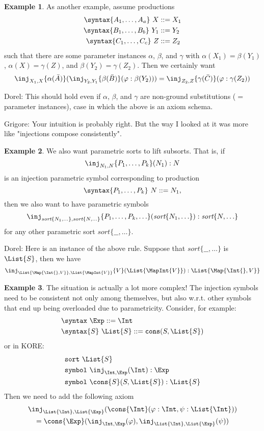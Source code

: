 \documentclass{article}
\newcommand\comment[2]{\par\noindent\color{red}#1: #2\color{black}\par\noindent}
\newcommand\dl{\comment{Dorel}}
\newcommand\gr{\comment{Grigore}}
\theoremstyle{definition}
\newtheorem{example}{Example}[section]
\theoremstyle{definition}
\theoremstyle{definition}
\theoremstyle{definition}
\theoremstyle{theorem}
\theoremstyle{theorem}
\theoremstyle{theorem}
\theoremstyle{theorem}
\theoremstyle{theorem}
\newcommand{\Sort}[1]{\textit{sort}\{#1\}}
\newcommand{\KWsymbol}{\texttt{symbol}}
\newcommand{\sort}{\texttt{sort}}
\begin{document}
\begin{example}\label{consistency-compose}
As another example, assume productions
\begin{align*}
\syntax\{A_1,\ldots,A_a\}\ X & ::=X_1\\
\syntax\{B_1,\ldots,B_b\}\ Y_1 & ::=Y_2\\
\syntax\{C_1,\ldots,C_c\}\ Z & ::=Z_2\\
\end{align*}
such that there are some parameter instances
\(\alpha\), \(\beta\), and \(\gamma\) with
\(\alpha(X_1) = \beta(Y_1)\), \(\alpha(X) = \gamma(Z)\),
and \(\beta(Y_2) = \gamma(Z_2)\).
Then we certainly want
\[\inj_{X_1,X}\{\alpha(\bar{A})\}(
  \inj_{Y_2,Y_1}\{\beta(\bar{B})\}(\varphi:\beta(Y_2)))
 = \inj_{Z_2,Z}\{\gamma(\bar{C})\}(\varphi:\gamma(Z_2))\]
\dl{This should hold even if $\alpha$, $\beta$, and $\gamma$ are non-ground substitutions ($=$ parameter instances), case in which the above is an axiom schema.}
\gr{Your intuition is probably right.  But the way I looked at it was more like "injections compose consistently".}
\end{example}

\begin{example}\label{consistency-lifting}
We also want parametric sorts to lift subsorts.
That is, if
\[\inj_{N_1,N}\{P_1,\ldots,P_k\}(N_1):N\]
is an injection parametric symbol corresponding to production
\[\syntax\{P_1,\ldots,P_k\}\ N::=N_1,\]
then we also want to have parametric symbols
\[\inj_{\Sort{N_1,\ldots},\Sort{N,\ldots}}
   \{P_1,\ldots,P_k,\ldots\}
    (\Sort{N_1,\ldots}) : \Sort{N,\ldots}\]
for any other parametric sort \(\Sort{\_\!\_,\ldots}\).
\dl{Here is an instance of the above rule. Suppose that \(\Sort{\_\!\_,\ldots}\) is
$\List{S}$, then we have
\[\inj_{\List{\Map{\Int\{\},V}},\List{\MapInt{V}}}\{V\}(\List{\MapInt{V}}):\List{\Map{\Int\{\},V}}\] 
}
\end{example}

\begin{example}\label{consistency-parametric}
The situation is actually a lot more complex!
The injection symbols need to be consistent not only among
themselves, but also w.r.t. other symbols that end up
being overloaded due to parametricity.
Consider, for example:
\begin{align*}
&\syntax\ \Exp::=\Int\\
&\syntax\{S\}\ \List{S}::=\texttt{cons}(S,\List{S})
\end{align*}
or in KORE:
\begin{align*}
&\sort\ \List{S}\\
&\KWsymbol\ \inj_{\Int,\Exp}(\Int):\Exp\\
&\KWsymbol\ \cons{S}(S,\List{S}):\List{S}
\end{align*}
Then we need to add the following axiom
\begin{multline*}
\inj_{\List{\Int},\List{\Exp}}(\cons{\Int}(\varphi:\Int,\psi:\List{\Int})) \\
 = \cons{\Exp}(\inj_{\Int,\Exp}(\varphi),\inj_{\List{\Int},\List{\Exp}}(\psi))
\end{multline*}
\end{example}
\end{document}
